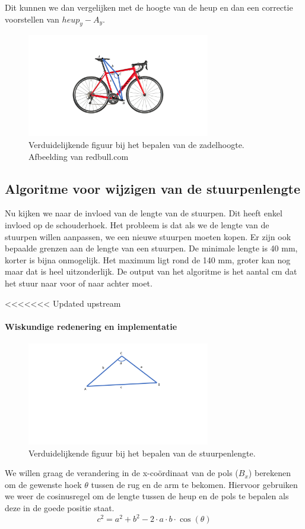\documentclass[a4paper,twoside,kulak]{kulakreport}
\begin{document}
Dit kunnen we dan vergelijken met de hoogte van de heup en dan een correctie voorstellen van \(heup_y - A_y\).
\begin{figure}
	\begin{center}
		\includegraphics[width=8cm]{fiets.pdf}
	\end{center}
	\caption{Verduidelijkende figuur bij het bepalen van de zadelhoogte. Afbeelding van redbull.com}
	\label{fiets}
\end{figure}

\subsection{Algoritme voor wijzigen van de stuurpenlengte}

Nu kijken we naar de invloed van de lengte van de stuurpen. Dit heeft enkel invloed op de schouderhoek. Het probleem is dat als we de lengte van de stuurpen willen aanpassen, we een nieuwe stuurpen moeten kopen. Er zijn ook bepaalde grenzen aan de lengte van een stuurpen. De minimale lengte is 40 \si{mm}, korter is bijna onmogelijk. Het maximum ligt rond de 140 \si{mm}, groter kan nog maar dat is heel uitzonderlijk. De output van het algoritme is het aantal \si{cm} dat het stuur naar voor of naar achter moet.

<<<<<<< Updated upstream
\paragraph{Wiskundige redenering en implementatie}

\begin{figure}
	\begin{center}
		\includegraphics[width=8cm]{yeye.pdf}
	\end{center}
	\caption{Verduidelijkende figuur bij het bepalen van de stuurpenlengte.}
	\label{stuurpenlengte}
\end{figure}
We willen graag de verandering in de x-coördinaat van de pols (\(B_x\)) berekenen om de gewenste hoek $\theta$ tussen de rug en de arm te bekomen. Hiervoor gebruiken we weer de cosinusregel om de lengte tussen de heup en de pols te bepalen als deze in de goede positie staat.
\[c^2 = a^2 + b^2 -2\cdot a\cdot b\cdot \cos(\theta)\]
\end{document}
